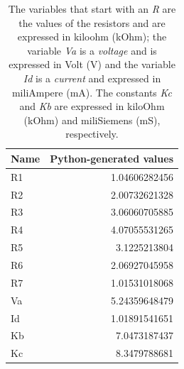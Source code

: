 \begin{table}[h]
  \centering
  \begin{tabular}{|l|r|}
    \hline    
    {\bf Name} & {\bf Python-generated values} \\ \hline
	R1 &  1.04606282456 \\ \hline
	R2 &  2.00732621328 \\ \hline
	R3 &  3.06060705885 \\ \hline
	R4 &  4.07055531265 \\ \hline
	R5 &  3.1225213804 \\ \hline
	R6 &  2.06927045958 \\ \hline
	R7 &  1.01531018068 \\ \hline
	Va &  5.24359648479 \\ \hline
	Id &  1.01891541651 \\ \hline
	Kb &  7.0473187437 \\ \hline
	Kc &  8.3479788681 \\ 
	\hline

  \end{tabular}
  \caption{The variables that start with an {\it R} are the values of the resistors 
    and are expressed in  kiloohm  (kOhm); the variable {\it Va} is a {\it voltage} and is expressed in
    Volt (V) and the variable {\it Id}  is a {\it current} and expressed in
   miliAmpere (mA). The constants {\it Kc} and {\it Kb} are  expressed in
   kiloOhm  (kOhm) and miliSiemens (mS), respectively.}
  \label{tab:python_values}
\end{table}




